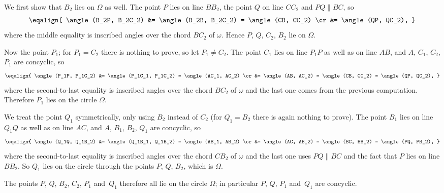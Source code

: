 {    We first show that $B_2$ lies on $\Omega$ as well. The point $P$ lies on line $BB_2$, the point $Q$ on line $CC_2$ and $PQ \parallel BC$, so
    $$
    \eqalign{
        \angle(B_2P, B_2C_2) &= \angle(B_2B, B_2C_2) = \angle(CB, CC_2) \cr
        &= \angle(QP, QC_2),
    }
    $$
    where the middle equality is inscribed angles over the chord $BC_2$ of $\omega$. Hence $P$, $Q$, $C_2$, $B_2$ lie on $\Omega$.

    Now the point $P_1$; for $P_1 = C_2$ there is nothing to prove, so let $P_1 \neq C_2$. The point $C_1$ lies on line $P_1P$ as well as on line $AB$, and $A$, $C_1$, $C_2$, $P_1$ are concyclic, so
    $$
    \eqalign{
        \angle(P_1P, P_1C_2) &= \angle(P_1C_1, P_1C_2) = \angle(AC_1, AC_2) \cr
        &= \angle(AB, AC_2) = \angle(CB, CC_2) = \angle(QP, QC_2),
    }
    $$
    where the second-to-last equality is inscribed angles over the chord $BC_2$ of $\omega$ and the last one comes from the previous computation. Therefore $P_1$ lies on the circle $\Omega$.

    We treat the point $Q_1$ symmetrically, only using $B_2$ instead of $C_2$ (for $Q_1 = B_2$ there is again nothing to prove). The point $B_1$ lies on line $Q_1Q$ as well as on line $AC$, and $A$, $B_1$, $B_2$, $Q_1$ are concyclic, so
    $$
    \eqalign{
        \angle(Q_1Q, Q_1B_2) &= \angle(Q_1B_1, Q_1B_2) = \angle(AB_1, AB_2) \cr
        &= \angle(AC, AB_2) = \angle(BC, BB_2) = \angle(PQ, PB_2),
    }
    $$
    where the second-to-last equality is inscribed angles over the chord $CB_2$ of $\omega$ and the last one uses $PQ \parallel BC$ and the fact that $P$ lies on line $BB_2$. So $Q_1$ lies on the circle through the points $P$, $Q$, $B_2$, which is $\Omega$.

    The points $P$, $Q$, $B_2$, $C_2$, $P_1$ and~$Q_1$ therefore all lie on the circle $\Omega$; in particular $P$, $Q$, $P_1$ and~$Q_1$ are concyclic.
}

